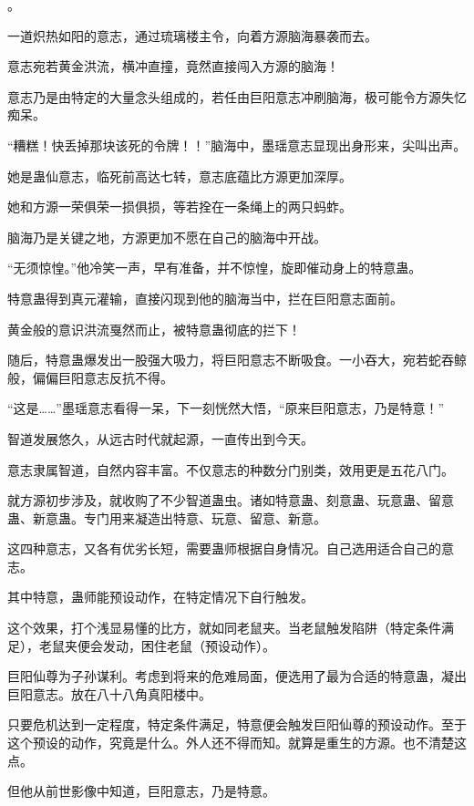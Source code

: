 
\begin{this_body}

。

一道炽热如阳的意志，通过琉璃楼主令，向着方源脑海暴袭而去。

意志宛若黄金洪流，横冲直撞，竟然直接闯入方源的脑海！

意志乃是由特定的大量念头组成的，若任由巨阳意志冲刷脑海，极可能令方源失忆痴呆。

“糟糕！快丢掉那块该死的令牌！！”脑海中，墨瑶意志显现出身形来，尖叫出声。

她是蛊仙意志，临死前高达七转，意志底蕴比方源更加深厚。

她和方源一荣俱荣一损俱损，等若拴在一条绳上的两只蚂蚱。

脑海乃是关键之地，方源更加不愿在自己的脑海中开战。

“无须惊惶。”他冷笑一声，早有准备，并不惊惶，旋即催动身上的特意蛊。

特意蛊得到真元灌输，直接闪现到他的脑海当中，拦在巨阳意志面前。

黄金般的意识洪流戛然而止，被特意蛊彻底的拦下！

随后，特意蛊爆发出一股强大吸力，将巨阳意志不断吸食。一小吞大，宛若蛇吞鲸般，偏偏巨阳意志反抗不得。

“这是……”墨瑶意志看得一呆，下一刻恍然大悟，“原来巨阳意志，乃是特意！”

智道发展悠久，从远古时代就起源，一直传出到今天。

意志隶属智道，自然内容丰富。不仅意志的种数分门别类，效用更是五花八门。

就方源初步涉及，就收购了不少智道蛊虫。诸如特意蛊、刻意蛊、玩意蛊、留意蛊、新意蛊。专门用来凝造出特意、玩意、留意、新意。

这四种意志，又各有优劣长短，需要蛊师根据自身情况。自己选用适合自己的意志。

其中特意，蛊师能预设动作，在特定情况下自行触发。

这个效果，打个浅显易懂的比方，就如同老鼠夹。当老鼠触发陷阱（特定条件满足），老鼠夹便会发动，困住老鼠（预设动作）。

巨阳仙尊为子孙谋利。考虑到将来的危难局面，便选用了最为合适的特意蛊，凝出巨阳意志。放在八十八角真阳楼中。

只要危机达到一定程度，特定条件满足，特意便会触发巨阳仙尊的预设动作。至于这个预设的动作，究竟是什么。外人还不得而知。就算是重生的方源。也不清楚这点。

但他从前世影像中知道，巨阳意志，乃是特意。


\end{this_body}
